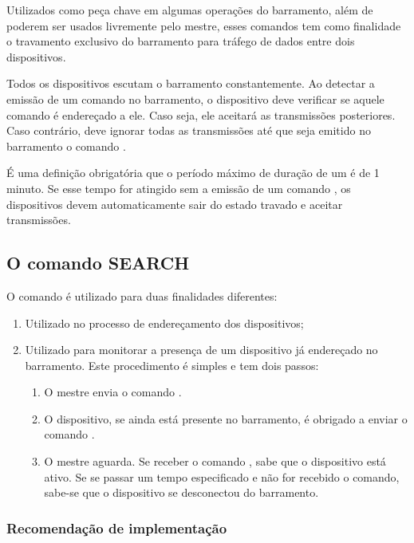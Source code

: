 \documentclass[11pt]{report}
\begin{document}
Utilizados como peça chave em algumas operações do barramento, além de poderem ser usados livremente pelo mestre, esses comandos tem como finalidade o travamento exclusivo do barramento para tráfego de dados entre dois dispositivos.

Todos os dispositivos escutam o barramento constantemente. Ao detectar a emissão de um comando  no barramento, o dispositivo deve verificar se aquele comando é endereçado a ele. Caso seja, ele aceitará as transmissões posteriores. Caso contrário, deve ignorar todas as transmissões até que seja emitido no barramento o comando .

É uma definição obrigatória que o período máximo de duração de um  é de 1 minuto. Se esse tempo for atingido sem a emissão de um comando , os dispositivos devem automaticamente sair do estado travado e aceitar transmissões.

\subsection{O comando SEARCH}

O comando  é utilizado para duas finalidades diferentes:

\begin{enumerate}

\item Utilizado no processo de endereçamento dos dispositivos;
\item Utilizado para monitorar a presença de um dispositivo já endereçado no barramento. Este procedimento é simples e tem dois passos:
\begin{enumerate}
\item O mestre envia o comando .
\item O dispositivo, se ainda está presente no barramento, é obrigado a enviar o comando .
\item O mestre aguarda. Se receber o comando , sabe que o dispositivo está ativo. Se se passar um tempo especificado e não for recebido o comando, sabe-se que o dispositivo se desconectou do barramento.
\end{enumerate}

\end{enumerate}

\subsubsection{Recomendação de implementação}
\end{document}
